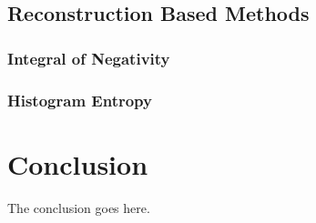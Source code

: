 \documentclass[10pt,journal,compsoc]{IEEEtran}
\begin{document}
\subsection{Reconstruction Based Methods}

\subsubsection{Integral of Negativity}

\subsubsection{Histogram Entropy}

\section{Conclusion}
The conclusion goes here.






%


\appendices
\section{}


\end{document}
